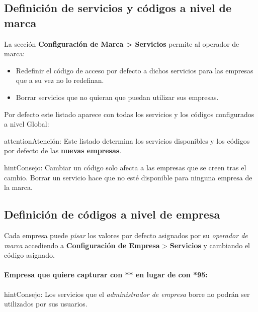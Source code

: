 \documentclass[letterpaper,10pt,spanish]{sphinxmanual}
\begin{document}
\subsection{Definición de servicios y códigos a nivel de marca}
\label{pbx_features/services:services-and-codes-for-brands}
La sección \textbf{Configuración de Marca \textgreater{} Servicios} permite al operador de marca:
\begin{itemize}
\item {} 
Redefinir el código de acceso por defecto a dichos servicios para las empresas que a su vez no lo redefinan.

\item {} 
Borrar servicios que no quieran que puedan utilizar sus empresas.

\end{itemize}

Por defecto este listado aparece con todas los servicios y los códigos configurados a nivel Global:

\begin{notice}{attention}{Atención:}
Este listado determina los servicios disponibles y los códigos por defecto de las \textbf{nuevas empresas}.
\end{notice}

\begin{notice}{hint}{Consejo:}
Cambiar un código solo afecta a las empresas que se creen tras el cambio. Borrar un servicio hace que no esté disponible para ninguna empresa de la marca.
\end{notice}


\subsection{Definición de códigos a nivel de empresa}
\label{pbx_features/services:services-and-codes-for-companies}
Cada empresa puede \emph{pisar} los valores por defecto asignados por su \emph{operador de marca} accediendo a \textbf{Configuración de Empresa} \textgreater{} \textbf{Servicios} y cambiando el código asignado.
\paragraph{Empresa que quiere capturar con ** en lugar de con *95:}

\noindent{}

\begin{notice}{hint}{Consejo:}
Los servicios que el \emph{administrador de empresa} borre no podrán ser utilizados por sus usuarios.
\end{notice}
\end{document}
